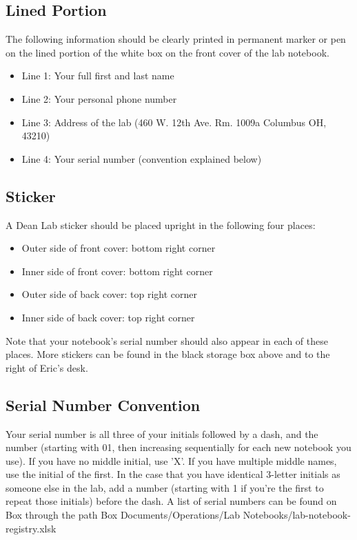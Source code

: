 \documentclass[11pt, oneside]{article}   	%
\begin{document}
\normalsize									
\subsection[Lined Portion]{Lined Portion}

The following information should be clearly printed in permanent marker or pen on the lined portion of the white box on the front cover of the lab notebook.
\begin{itemize}
	\item Line 1: Your full first and last name
	\item Line 2: Your personal phone number
	\item Line 3: Address of the lab (460 W. 12th Ave. Rm. 1009a Columbus OH, 43210)
	\item Line 4: Your serial number (convention explained below)
\end{itemize}

\subsection[Sticker]{Sticker}	

A Dean Lab sticker should be placed upright in the following four places:
\begin{itemize}
	\item Outer side of front cover: bottom right corner
	\item Inner side of front cover: bottom right corner
	\item Outer side of back cover: top right corner
	\item Inner side of back cover: top right corner
\end{itemize}
	
Note that your notebook's serial number should also appear in each of these places. More stickers can be found in the black storage box above and to the right of Eric's desk. 

\subsection[Serial Number Convention]{Serial Number Convention}		

Your serial number is all three of your initials followed by a dash, and the number (starting with 01, then increasing sequentially for each new notebook you use). If you have no middle initial, use 'X'. If you have multiple middle names, use the initial of the first. In the case that you have identical 3-letter initials as someone else in the lab, add a number (starting with 1 if you're the first to repeat those initials) before the dash. A list of serial numbers can be found on Box through the path Box Documents/Operations/Lab Notebooks/lab-notebook-registry.xlsk
\end{document}
